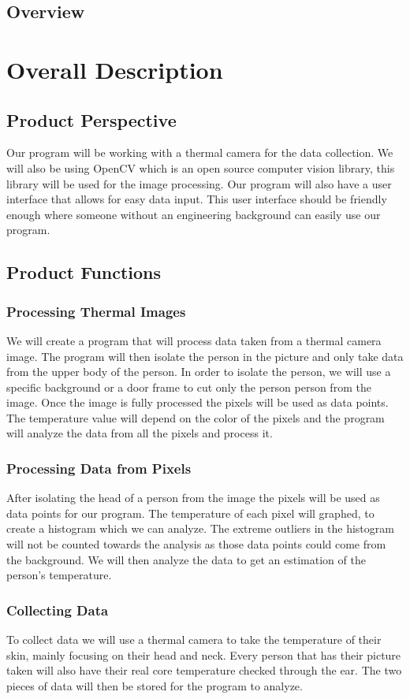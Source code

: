 \documentclass[10pt, draftclsnofoot, onecolumn]{IEEEtran}
\begin{document}
	\subsection{Overview}
\section{Overall Description}
	\subsection{Product Perspective}
		Our program will be working with a thermal camera for the data collection. We will also be using OpenCV which is an open source computer vision library, this library will be used for the image processing. 
		Our program will also have a user interface that allows for easy data input. This user interface should be friendly enough where someone without an engineering background can easily use our program. 
	\subsection{Product Functions}
		\subsubsection{Processing Thermal Images}
		We will create a program that will process data taken from a thermal camera image. The program will then isolate the person in the picture and only take data from the upper body of the person. In order to isolate the person, we will use a specific background or a door frame to cut only the person person from the image. Once the image is fully processed the pixels will be used as data points. The temperature value will depend on the color of the pixels and the program will analyze the data from all the pixels and process it. 
		\subsubsection{Processing Data from Pixels}
		After isolating the head of a person from the image the pixels will be used as data points for our program. The temperature of each pixel will graphed, to create a histogram which we can analyze. The extreme outliers in the histogram will not be counted towards the analysis as those data points could come from the background. We will then analyze the data to get an estimation of the person’s temperature.
		\subsubsection{Collecting Data}
		To collect data we will use a thermal camera to take the temperature of their skin, mainly focusing on their head and neck. Every person that has their picture taken will also have their real core temperature checked through the ear. The two pieces of data will then be stored for the program to analyze.
\end{document}

